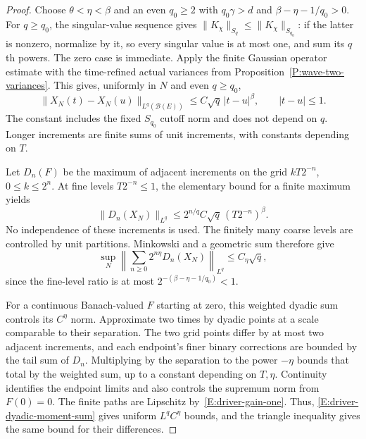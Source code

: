 \begin{proof}
  Choose $\theta<\eta<\beta$ and an even $q_0\ge2$ with
  $q_0\gamma>d$ and $\beta-\eta-1/q_0>0$. For $q\ge q_0$, the
  singular-value sequence gives
  $\|K_\chi\|_{S_q}\le\|K_\chi\|_{S_{q_0}}$: if the latter is nonzero,
  normalize by it, so every singular value is at most one, and sum its
  $q$th powers. The zero case is immediate. Apply the finite Gaussian
  operator estimate with the time-refined actual variances from
  Proposition~\ref{P:wave-two-variances}. This gives, uniformly in $N$
  and even $q\ge q_0$,
  \begin{equation}\label{E:driver-increment-moments}
    \|X_N(t)-X_N(u)\|_{L^q(\mathcal B(E))}
    \le C\sqrt q\,|t-u|^\beta,\qquad |t-u|\le1.
  \end{equation}
  The constant includes the fixed $S_{q_0}$ cutoff norm and does not
  depend on $q$. Longer increments are finite sums of unit increments,
  with constants depending on $T$.

  Let $D_n(F)$ be the maximum of adjacent increments on the grid
  $kT2^{-n}$, $0\le k\le2^n$. At fine levels $T2^{-n}\le1$, the
  elementary bound for a finite maximum yields
  \[
    \|D_n(X_N)\|_{L^q}
    \le 2^{n/q}C\sqrt q\,(T2^{-n})^\beta.
  \]
  No independence of these increments is used. The finitely many coarse
  levels are controlled by unit partitions. Minkowski and a geometric
  sum therefore give
  \begin{equation}\label{E:driver-dyadic-moment-sum}
    \sup_N\left\|\sum_{n\ge0}2^{n\eta}D_n(X_N)\right\|_{L^q}
    \le C_\eta\sqrt q,
  \end{equation}
  since the fine-level ratio is at most
  $2^{-(\beta-\eta-1/q_0)}<1$.

  For a continuous Banach-valued $F$ starting at zero, this weighted
  dyadic sum controls its $C^\eta$ norm. Approximate two times by dyadic
  points at a scale comparable to their separation. The two grid points
  differ by at most two adjacent increments, and each endpoint's finer
  binary corrections are bounded by the tail sum of $D_n$. Multiplying
  by the separation to the power $-\eta$ bounds that total by the weighted
  sum, up to a constant depending on $T,\eta$. Continuity identifies the
  endpoint limits and also controls the supremum norm from $F(0)=0$.
  The finite paths are Lipschitz by~\eqref{E:driver-gain-one}. Thus,
  \eqref{E:driver-dyadic-moment-sum} gives uniform $L^qC^\eta$ bounds,
  and the triangle inequality gives the same bound for their differences.


\end{proof}
